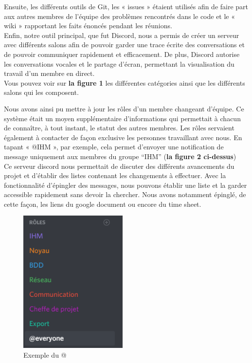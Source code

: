 \documentclass[a4paper,11pt]{article}
\begin{document}
    Ensuite, les différents outils de Git, les « issues » étaient utilisés afin de faire part aux autres membres de l’équipe des problèmes rencontrés dans le code et le « wiki »  rapportant les faits énoncés pendant les réunions. \\




    Enfin, notre outil principal, que fut Discord, nous a permis de créer un serveur avec différents salons afin de pouvoir garder une trace écrite des conversations et de pouvoir communiquer rapidement et efficacement. De plus, Discord autorise les conversations vocales et le partage d’écran, permettant la visualisation du travail d’un membre en direct. \\



Vous pouvez voir sur \textbf{la figure 1} les différentes catégories ainsi que les différents salons qui les composent. \\

\newpage

    Nous avons ainsi pu mettre à jour les rôles d’un membre changeant d’équipe. Ce système était un moyen supplémentaire d’informations qui permettait à chacun de connaître, à tout instant, le statut des autres membres. Les rôles servaient également à contacter de façon exclusive les personnes travaillant avec nous.  En tapant « @IHM », par exemple, cela permet d’envoyer une notification de message uniquement aux membres du groupe  “IHM” (\textbf{la figure 2 ci-dessus}) \\

    Ce serveur discord nous permettait de discuter des différents avancements du projet et d’établir des listes contenant les changements à effectuer. Avec la fonctionnalité d’épingler des messages, nous pouvons établir une liste et la garder accessible rapidement sans devoir la chercher. Nous avons notamment épinglé, de cette façon, les liens du google document ou encore du time sheet. \\


\begin{figure}
	\begin{center}
	\includegraphics[width=0.48\textwidth]{Img/image5.png}
	\end{center}
	\caption{Exemple du @}	
\end{figure}
\end{document}
